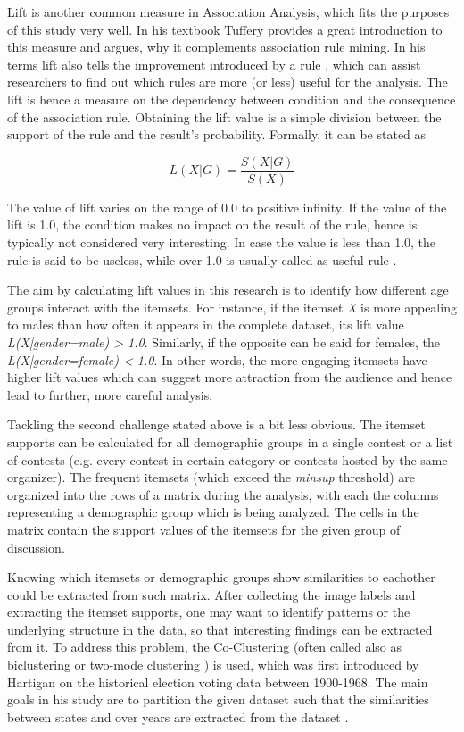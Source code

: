 Lift is another common measure in Association Analysis, which fits the purposes of this study very well. In his textbook Tuffery \cite{tuffery2011data} provides a great introduction to this measure and argues, why it complements association rule mining. In his terms lift also tells the improvement introduced by a rule \cite{tuffery2011data}, which can assist researchers to find out which rules are more (or less) useful for the analysis. The lift is hence a measure on the dependency between condition and the consequence of the association rule. Obtaining the lift value is a simple division between the support of the rule and the result's probability. Formally, it can be stated as

\begin{equation}
    L(X|G) = \frac{S(X|G)}{S(X)}
\end{equation}

The value of lift varies on the range of 0.0 to positive infinity. If the value of the lift is 1.0, the condition makes no impact on the result of the rule, hence is typically not considered very interesting. In case the value is less than 1.0, the rule is said to be useless, while over 1.0 is usually called as useful rule \cite{tuffery2011data}. 

The aim by calculating lift values in this research is to identify how different age groups interact with the itemsets. For instance, if the itemset \emph{X} is more appealing to males than how often it appears in the complete dataset, its lift value \emph{L(X|gender=male) > 1.0}. Similarly, if the opposite can be said for females, the \emph{L(X|gender=female) < 1.0}. In other words, the more engaging itemsets have higher lift values which can suggest more attraction from the audience and hence lead to further, more careful analysis.

Tackling the second challenge stated above is a bit less obvious. The itemset supports can be calculated for all demographic groups in a single contest or a list of contests (e.g. every contest in certain category or contests hosted by the same organizer). The frequent itemsets (which exceed the \emph{minsup} threshold) are organized into the rows of a matrix during the analysis, with each the columns representing a demographic group which is being analyzed. The cells in the matrix contain the support values of the itemsets for the given group of discussion. 

Knowing which itemsets or demographic groups show similarities to eachother could be extracted from such matrix. After collecting the image labels and extracting the itemset supports, one may want to identify patterns or the underlying structure in the data, so that interesting findings can be extracted from it. To address this problem, the Co-Clustering (often called also as biclustering or two-mode clustering \cite{coclustering}) is used, which was first introduced by Hartigan \cite{hartigan-direct-clustering-data-1972} on the historical election voting data between 1900-1968. The main goals in his study are to partition the given dataset such that the similarities between states and over years are extracted from the dataset \cite{hartigan-direct-clustering-data-1972}. 


